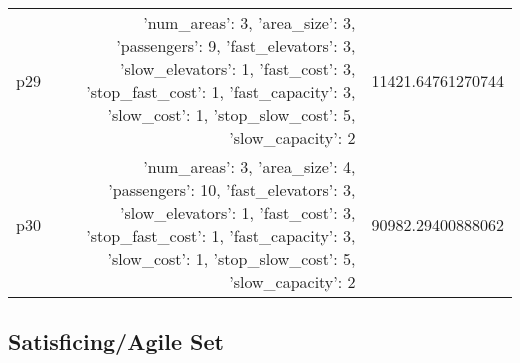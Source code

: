 \documentclass{article}
\begin{document}
\begin{center}
\begin{tabular}{r|r|r}
  p29&{'num\_areas': 3, 'area\_size': 3, 'passengers': 9, 'fast\_elevators': 3, 'slow\_elevators': 1, 'fast\_cost': 3, 'stop\_fast\_cost': 1, 'fast\_capacity': 3, 'slow\_cost': 1, 'stop\_slow\_cost': 5, 'slow\_capacity': 2}&11421.64761270744\\
  p30&{'num\_areas': 3, 'area\_size': 4, 'passengers': 10, 'fast\_elevators': 3, 'slow\_elevators': 1, 'fast\_cost': 3, 'stop\_fast\_cost': 1, 'fast\_capacity': 3, 'slow\_cost': 1, 'stop\_slow\_cost': 5, 'slow\_capacity': 2}&90982.29400888062
                            \end{tabular}
                            \end{center}
                    

                                \subsection*{Satisficing/Agile Set}
                                
\end{document}
